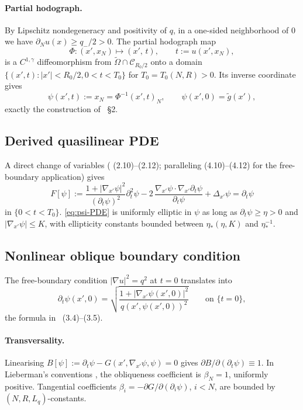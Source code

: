 \documentclass[11pt,a4paper]{article}
\theoremstyle{definition}
\theoremstyle{remark}
\newcommand{\Om}{\widetilde{\Omega}}
\begin{document}
\paragraph{Partial hodograph.}
By Lipschitz nondegeneracy and positivity of $q$, in a one-sided
neighborhood of $0$ we have $\partial_{N}u(x)\ge q_{-}/2>0$. The
partial hodograph map
\[
   \Phi:(x',x_{N})\mapsto(x',\,t),\qquad t:=u(x',x_{N}),
\]
is a $C^{1,\gamma}$ diffeomorphism from $\Om\cap\mathcal{C}_{R_{0}/2}$
onto a domain $\{(x',t):|x'|<R_{0}/2,0<t<T_{0}\}$ for $T_{0}=T_{0}(N,R)>0$.
Its inverse coordinate gives
\[
   \psi(x',t):=x_{N}=\Phi^{-1}(x',t)_{N},\qquad
   \psi(x',0)=\widetilde g(x'),
\]
exactly the construction of \cite{KN}~\S2.

\subsection{Derived quasilinear PDE}\label{ss:hodo-PDE}

A direct change of variables (\cite{KN} (2.10)--(2.12); paralleling
(4.10)--(4.12) for the free-boundary application) gives
\begin{equation}\label{eq:psi-PDE}
   F[\psi]
     :=\frac{1+|\nabla_{x'}\psi|^{2}}{(\partial_{t}\psi)^{2}}\partial_{t}^{2}\psi
        -2\,\frac{\nabla_{x'}\psi\cdot\nabla_{x'}\partial_{t}\psi}{\partial_{t}\psi}
        +\Delta_{x'}\psi
     =\partial_{t}\psi
\end{equation}
in $\{0<t<T_{0}\}$. \eqref{eq:psi-PDE} is uniformly elliptic in $\psi$ as
long as $\partial_{t}\psi\ge\eta>0$ and $|\nabla_{x'}\psi|\le K$, with
ellipticity constants bounded between $\eta_{*}(\eta,K)$ and
$\eta_{*}^{-1}$.

\subsection{Nonlinear oblique boundary condition}\label{ss:hodo-BC}

The free-boundary condition $|\nabla u|^{2}=q^{2}$ at $t=0$ translates
into
\begin{equation}\label{eq:BC-psi}
   \partial_{t}\psi(x',0)
   = \sqrt{\frac{1+|\nabla_{x'}\psi(x',0)|^{2}}{q(x',\psi(x',0))^{2}}}
   \qquad\text{on }\{t=0\},
\end{equation}
the formula in \cite{KN}~(3.4)--(3.5).

\paragraph{Transversality.}
Linearising $B[\psi]:=\partial_{t}\psi-G(x',\nabla_{x'}\psi,\psi)=0$
gives $\partial B/\partial(\partial_{t}\psi)\equiv1$. In Lieberman's
conventions \cite[\S1]{Li86}, the obliqueness coefficient is
$\beta_{N}=1$, uniformly positive. Tangential coefficients
$\beta_{i}=-\partial G/\partial(\partial_{i}\psi)$, $i<N$, are bounded
by $(N,R,L_{q})$-constants.
\end{document}
